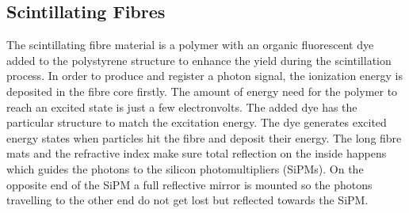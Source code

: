 \subsection{Scintillating Fibres}
The scintillating fibre material is a polymer with an organic fluorescent dye
added to the polystyrene structure to enhance the yield during the scintillation process.
In order to produce and register a photon signal, the ionization energy is deposited
in the fibre core firstly. The amount of energy need for the polymer to reach an
excited state is just a few electronvolts. The added dye has the particular structure
to match the excitation energy. The dye generates excited energy states when
particles hit the fibre and deposit their energy.
The long fibre mats and the refractive index make sure total reflection on the inside
happens which guides the photons to the silicon photomultipliers (SiPMs).
On the opposite end of the SiPM a full reflective mirror is mounted so the photons travelling to the other end do not get lost but reflected towards the SiPM.
